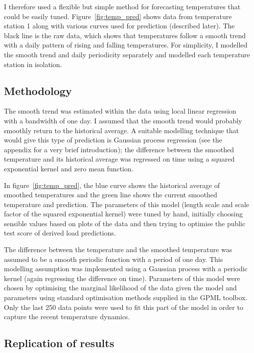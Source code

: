 \documentclass[preprint,authoryear,12pt]{elsarticle}
\begin{document}
I therefore used a flexible but simple method for forecasting temperatures that could be easily tuned.
Figure~\ref{fig:temp_pred} shows data from temperature station 1 along with various curves used for prediction (described later).
The black line is the raw data, which shows that temperatures follow a smooth trend with a daily pattern of rising and falling temperatures.
For simplicity, I modelled the smooth trend and daily periodicity separately and modelled each temperature station in isolation.

\subsection{Methodology}

The smooth trend was estimated within the data using local linear regression \citep[e.g. chapter 6 of][]{Hastie2009} with a bandwidth of one day.
I assumed that the smooth trend would probably smoothly return to the historical average.
A suitable modelling technique that would give this type of prediction is Gaussian process regression \citep[e.g.][]{Rasmussen2006} (see the appendix for a very brief introduction); the difference between the smoothed temperature and its historical average was regressed on time using a squared exponential kernel and zero mean function.

In figure~\ref{fig:temp_pred}, the blue curve shows the historical average of smoothed temperatures and the green line shows the current smoothed temperature and prediction.
The parameters of this model (length scale and scale factor of the squared exponential kernel) were tuned by hand, initially choosing sensible values based on plots of the data and then trying to optimise the public test score of derived load predictions.

The difference between the temperature and the smoothed temperature was assumed to be a smooth periodic function with a period of one day.
This modelling assumption was implemented using a Gaussian process with a periodic kernel (again regressing the difference on time).
Parameters of this model were chosen by optimising the marginal likelihood of the data given the model and parameters using standard optimisation methods supplied in the GPML toolbox\footnotemark.
Only the last 250 data points were used to fit this part of the model in order to capture the recent temperature dynamics.

\subsection{Replication of results}
\end{document}
